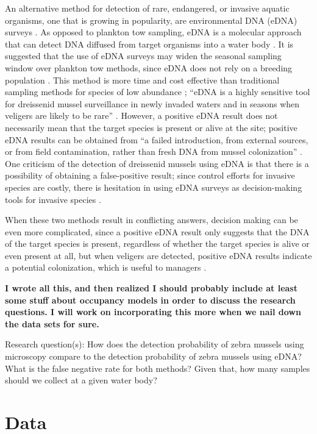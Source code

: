 \documentclass[12pt]{article}\usepackage[]{graphicx}\usepackage[]{color}
\begin{document}
An alternative method for detection of rare, endangered, or invasive aquatic organisms, one that is growing in popularity, are environmental DNA (eDNA) surveys \cite{Schmelzle}. As opposed to plankton tow sampling, eDNA is a molecular approach that can detect DNA diffused from target organisms into a water body \cite{Sepulveda:eDNA}. It is suggested that the use of eDNA surveys may widen the seasonal sampling window over plankton tow methods, since eDNA does not rely on a breeding population \cite{Sepulveda:eDNA}. This method is more time and cost effective than traditional sampling methods for species of low abundance \cite{Rees}; ``eDNA is a highly sensitive tool for dreissenid mussel surveillance in newly invaded waters and in seasons when veligers are likely to be rare'' \cite{Sepulveda:eDNA}. However, a positive eDNA result does not necessarily mean that the target species is present or alive at the site; positive eDNA results can be obtained from ``a failed introduction, from external sources, or from field contamination, rather than fresh DNA from mussel colonization'' \cite{Sepulveda:eDNA}. One criticism of the detection of dreissenid mussels using eDNA is that there is a possibility of obtaining a false-positive result; since control efforts for invasive species are costly, there is hesitation in using eDNA surveys as decision-making tools for invasive species \cite{Sepulveda:eDNA}. 

When these two methods result in conflicting answers, decision making can be even more complicated, since a positive eDNA result only suggests that the DNA of the target species is present, regardless of whether the target species is alive or even present at all, but when veligers are detected, positive eDNA results indicate a potential colonization, which is useful to managers \cite{Holser:body}.


\textbf{I wrote all this, and then realized I should probably include at least some stuff about occupancy models in order to discuss the research questions. I will work on incorporating this more when we nail down the data sets for sure.} 

Research question(s): How does the detection probability of zebra mussels using microscopy compare to the detection probability of zebra mussels using eDNA? What is the false negative rate for both methods? Given that, how many samples should we collect at a given water body? 


\section{Data}
\end{document}
